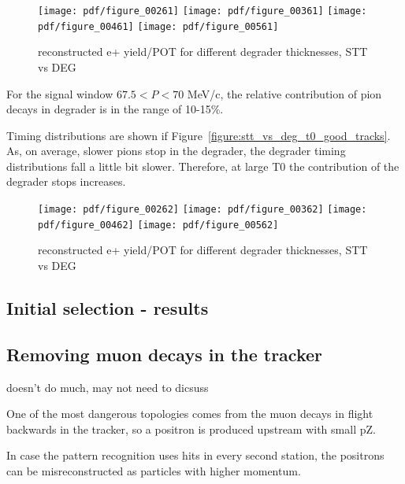 \begin{figure}[H]
  \texttt{[image: pdf/figure\_00261]}
  \texttt{[image: pdf/figure\_00361]}
  \texttt{[image: pdf/figure\_00461]}
  \texttt{[image: pdf/figure\_00561]}
  \caption{
    \label{fig:stt_vs_deg_momentum_good_tracks}
    reconstructed e+ yield/POT for different degrader thicknesses, STT vs DEG
  }
\end{figure}

For the signal window $67.5 < P < 70$ MeV/c, the relative contribution of pion
decays in degrader is in the range of 10-15\%.

Timing distributions are shown if Figure~\ref{figure:stt_vs_deg_t0_good_tracks}.
As, on average, slower pions stop in the degrader, the degrader timing distributions
fall a little bit slower.
Therefore, at large T0 the contribution of the degrader stops increases.


\begin{figure}[H]
  \texttt{[image: pdf/figure\_00262]}
  \texttt{[image: pdf/figure\_00362]}
  \texttt{[image: pdf/figure\_00462]}
  \texttt{[image: pdf/figure\_00562]}
  \caption{
    \label{figure:stt_vs_deg_t0}
    reconstructed e+ yield/POT for different degrader thicknesses, STT vs DEG
  }
\end{figure}

\subsection{Initial selection - results}




\subsection{Removing muon decays in the tracker}
{\red doesn't do much, may not need to dicsuss} 

One of the most dangerous topologies comes from the muon decays in flight backwards in the tracker,
so a positron is produced upstream with small pZ.

In case the pattern recognition uses hits in every second station, the positrons can be misreconstructed
as particles with higher momentum.

